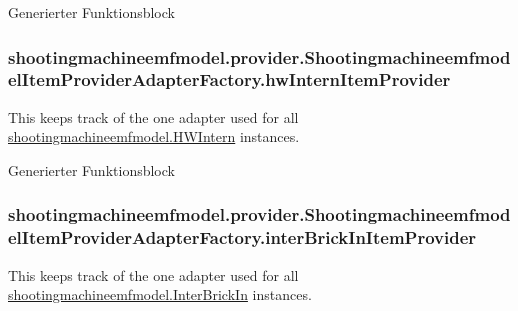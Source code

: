 Generierter Funktionsblock \hypertarget{classshootingmachineemfmodel_1_1provider_1_1_shootingmachineemfmodel_item_provider_adapter_factory_a1aa46d3bffc3396b540d7771314de73e}{
\subsubsection[{hw\-Intern\-Item\-Provider}]{ shootingmachineemfmodel.\-provider.\-Shootingmachineemfmodel\-Item\-Provider\-Adapter\-Factory.\-hw\-Intern\-Item\-Provider\hspace{0.3cm}{\ttfamily [protected]}}}\label{classshootingmachineemfmodel_1_1provider_1_1_shootingmachineemfmodel_item_provider_adapter_factory_a1aa46d3bffc3396b540d7771314de73e}
This keeps track of the one adapter used for all \hyperlink{interfaceshootingmachineemfmodel_1_1_h_w_intern}{shootingmachineemfmodel.\-H\-W\-Intern} instances.

Generierter Funktionsblock \hypertarget{classshootingmachineemfmodel_1_1provider_1_1_shootingmachineemfmodel_item_provider_adapter_factory_a908987ed29cc05916c088de6d383e130}{
\subsubsection[{inter\-Brick\-In\-Item\-Provider}]{ shootingmachineemfmodel.\-provider.\-Shootingmachineemfmodel\-Item\-Provider\-Adapter\-Factory.\-inter\-Brick\-In\-Item\-Provider\hspace{0.3cm}{\ttfamily [protected]}}}\label{classshootingmachineemfmodel_1_1provider_1_1_shootingmachineemfmodel_item_provider_adapter_factory_a908987ed29cc05916c088de6d383e130}
This keeps track of the one adapter used for all \hyperlink{interfaceshootingmachineemfmodel_1_1_inter_brick_in}{shootingmachineemfmodel.\-Inter\-Brick\-In} instances.

